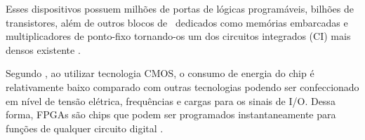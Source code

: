 
      Esses dispositivos possuem milhões de portas de lógicas programáveis, bilhões de transistores, além de outros blocos de \hardware\ dedicados como memórias embarcadas e multiplicadores de ponto-fixo tornando-os um dos circuitos integrados (CI) mais densos existente \cite{Choi2016}.

      Segundo \cite{tocci2003sistemas},
      ao utilizar tecnologia CMOS, o consumo de energia do chip é relativamente baixo comparado com outras tecnologias podendo ser confeccionado em nível de tensão elétrica, frequências e cargas para os sinais de I/O.
      Dessa forma, FPGAs são chips que podem ser programados instantaneamente para funções de qualquer circuito digital \cite{Choi2016}.

